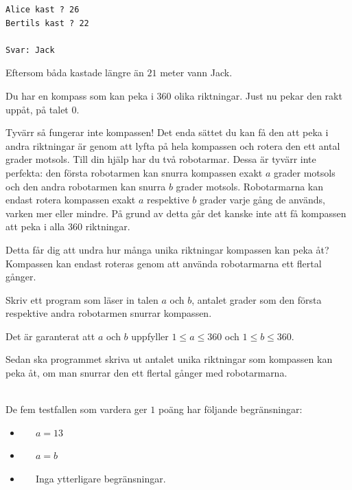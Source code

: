 \vspace{1cm}

\begin{verbatim}
Alice kast ? 26
Bertils kast ? 22

Svar: Jack
\end{verbatim}
 Eftersom båda kastade längre än $21$ meter vann Jack.

\newpage
{}



Du har en kompass som kan peka i $360$ olika riktningar. Just nu pekar den rakt uppåt, på talet $0$.

Tyvärr så fungerar inte kompassen! Det enda sättet du kan få den att peka i andra riktningar
är genom att lyfta på hela kompassen och rotera den ett antal grader motsols. Till din hjälp har du
två robotarmar. Dessa är tyvärr inte perfekta: den första robotarmen kan
snurra kompassen exakt $a$ grader motsols och den andra robotarmen kan snurra $b$ grader motsols.
Robotarmarna kan endast rotera kompassen exakt $a$ respektive $b$ grader varje gång
de används, varken mer eller mindre.
På grund av detta går det kanske inte att få kompassen att peka
i alla $360$ riktningar.

Detta får dig att undra hur många unika riktningar kompassen kan peka åt?
Kompassen kan endast roteras genom att använda robotarmarna ett flertal gånger.

Skriv ett program som läser in talen $a$ och $b$, antalet grader som den första respektive andra robotarmen snurrar kompassen.

Det är garanterat att $a$ och $b$ uppfyller $1 \leq a \leq 360$ och $1 \leq b \leq 360$.

Sedan ska programmet skriva ut antalet unika riktningar som kompassen kan peka åt, om man snurrar den ett flertal gånger med robotarmarna.

\\
De fem testfallen som vardera ger $1$ poäng har följande begränsningar:
\begin{itemize}
  \item[(1)] $\;\;\;\;$ $a = 13$
  \item[(2-3)] $\;\;\;\;$ $a = b$
  \item[(4-5)] $\;\;\;\; $ Inga ytterligare begränsningar.
\end{itemize}

